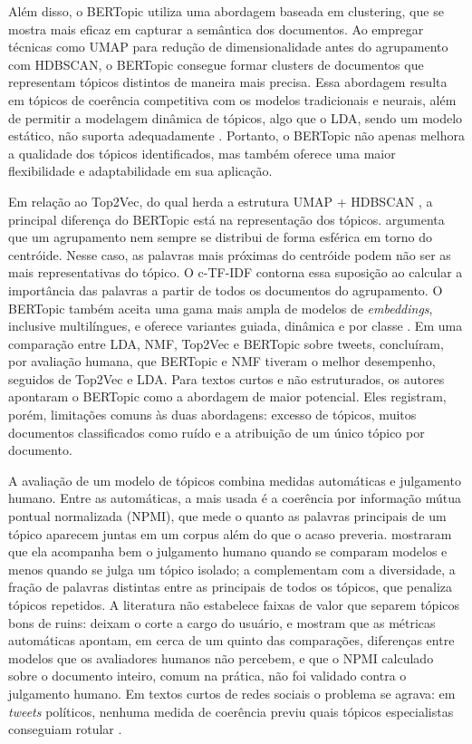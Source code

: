 Além disso, o BERTopic utiliza uma abordagem baseada em clustering, que se mostra mais eficaz em capturar a semântica dos documentos. Ao empregar técnicas como UMAP para redução de dimensionalidade antes do agrupamento com HDBSCAN, o BERTopic consegue formar clusters de documentos que representam tópicos distintos de maneira mais precisa. Essa abordagem resulta em tópicos de coerência competitiva com os modelos tradicionais e neurais, além de permitir a modelagem dinâmica de tópicos, algo que o LDA, sendo um modelo estático, não suporta adequadamente \cite{grootendorst2022}. Portanto, o BERTopic não apenas melhora a qualidade dos tópicos identificados, mas também oferece uma maior flexibilidade e adaptabilidade em sua aplicação.

Em relação ao Top2Vec, do qual herda a estrutura UMAP + HDBSCAN \cite{egger2022}, a principal diferença do BERTopic está na representação dos tópicos.  argumenta que um agrupamento nem sempre se distribui de forma esférica em torno do centróide. Nesse caso, as palavras mais próximas do centróide podem não ser as mais representativas do tópico. O c-TF-IDF contorna essa suposição ao calcular a importância das palavras a partir de todos os documentos do agrupamento. O BERTopic também aceita uma gama mais ampla de modelos de \emph{embeddings}, inclusive multilíngues, e oferece variantes guiada, dinâmica e por classe \cite{egger2022}. Em uma comparação entre LDA, NMF, Top2Vec e BERTopic sobre tweets,  concluíram, por avaliação humana, que BERTopic e NMF tiveram o melhor desempenho, seguidos de Top2Vec e LDA. Para textos curtos e não estruturados, os autores apontaram o BERTopic como a abordagem de maior potencial. Eles registram, porém, limitações comuns às duas abordagens: excesso de tópicos, muitos documentos classificados como ruído e a atribuição de um único tópico por documento.

A avaliação de um modelo de tópicos combina medidas automáticas e julgamento humano. Entre as automáticas, a mais usada é a coerência por informação mútua pontual normalizada (NPMI), que mede o quanto as palavras principais de um tópico aparecem juntas em um corpus além do que o acaso preveria.  mostraram que ela acompanha bem o julgamento humano quando se comparam modelos e menos quando se julga um tópico isolado;  a complementam com a diversidade, a fração de palavras distintas entre as principais de todos os tópicos, que penaliza tópicos repetidos. A literatura não estabelece faixas de valor que separem tópicos bons de ruins:  deixam o corte a cargo do usuário, e  mostram que as métricas automáticas apontam, em cerca de um quinto das comparações, diferenças entre modelos que os avaliadores humanos não percebem, e que o NPMI calculado sobre o documento inteiro, comum na prática, não foi validado contra o julgamento humano. Em textos curtos de redes sociais o problema se agrava: em \emph{tweets} políticos, nenhuma medida de coerência previu quais tópicos especialistas conseguiam rotular \cite{doogan2021}.

